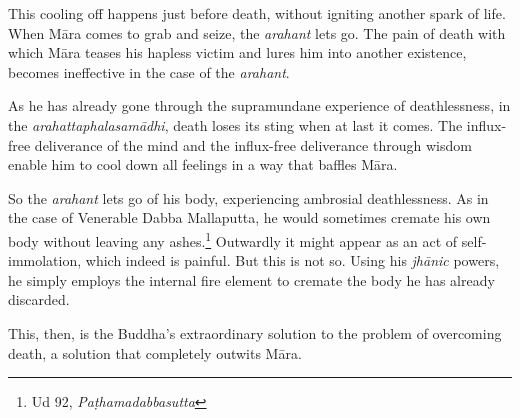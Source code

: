 This cooling off happens just before death, without igniting another spark of life. When Māra comes to grab and seize, the \emph{arahant} lets go. The pain of death with which Māra teases his hapless victim and lures him into another existence, becomes ineffective in the case of the \emph{arahant}.

As he has already gone through the supramundane experience of deathlessness, in the \emph{arahattaphalasamādhi}, death loses its sting when at last it comes. The influx-free deliverance of the mind and the influx-free deliverance through wisdom enable him to cool down all feelings in a way that baffles Māra.

So the \emph{arahant} lets go of his body, experiencing ambrosial deathlessness. As in the case of Venerable Dabba Mallaputta, he would sometimes cremate his own body without leaving any ashes.\footnote{Ud 92, \emph{Paṭhamadabbasutta}} Outwardly it might appear as an act of self-immolation, which indeed is painful. But this is not so. Using his \emph{jhānic} powers, he simply employs the internal fire element to cremate the body he has already discarded.

This, then, is the Buddha's extraordinary solution to the problem of overcoming death, a solution that completely outwits Māra.
